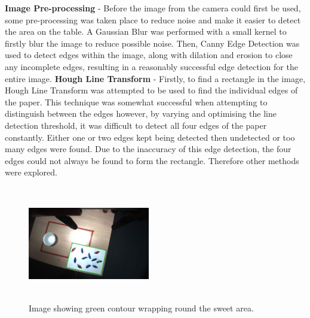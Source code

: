 \textbf{Image Pre-processing} - 
Before the image from the camera could first be used, some pre-processing was taken place to reduce noise and make it easier to detect the area on the table. A Gaussian Blur was performed with a small kernel to firstly blur the image to reduce possible noise. Then, Canny Edge Detection was used to detect edges within the image, along with dilation and erosion to close any incomplete edges, resulting in a reasonably successful edge detection for the entire image.
%
\newline
\newline
\textbf{Hough Line Transform} - 
Firstly, to find a rectangle in the image, Hough Line Transform was attempted to be used to find the individual edges of the paper. This technique was somewhat successful when attempting to distinguish between the edges however, by varying and optimising the line detection threshold, it was difficult to detect all four edges of the paper constantly. Either one or two edges kept being detected then undetected or too many edges were found. Due to the inaccuracy of this edge detection, the four edges could not always be found to form the rectangle. Therefore other methods were explored.
\captionsetup[figure]{justification=centering}
\begin{figure}[H]
        \centering 
        \includegraphics[width=0.475\textwidth, height=5cm]{contourfound.jpg}
        \caption{Image showing green contour wrapping round the sweet area.}
        \label{fig:morphAnalysis}
\end{figure}
